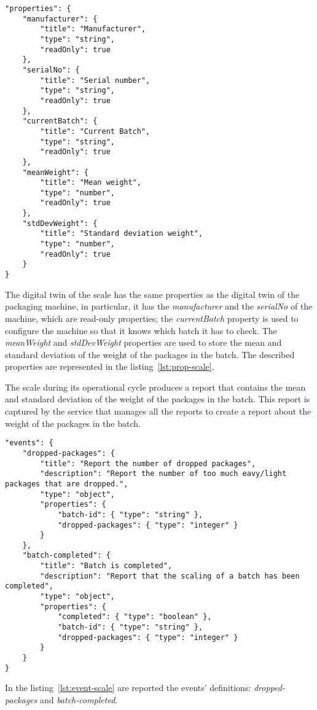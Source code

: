 \begin{lstlisting}[caption={Properties of the scale Thing Model.},label={lst:prop-scale}]
"properties": {
	"manufacturer": {
		"title": "Manufacturer",
		"type": "string",
		"readOnly": true
	},
	"serialNo": {
		"title": "Serial number",
		"type": "string",
		"readOnly": true
	},
	"currentBatch": {
		"title": "Current Batch",
		"type": "string",
		"readOnly": true
	},
	"meanWeight": {
		"title": "Mean weight",
		"type": "number",
		"readOnly": true
	},
	"stdDevWeight": {
		"title": "Standard deviation weight",
		"type": "number",
		"readOnly": true
	}
}
\end{lstlisting}

The digital twin of the scale has the same properties as the digital twin of the packaging machine, in particular, it has the \textit{manufacturer} and the \textit{serialNo} of the machine, which are read-only properties; the \textit{currentBatch} property is used to configure the machine so that it knows which batch it has to check. The \textit{meanWeight} and \textit{stdDevWeight} properties are used to store the mean and standard deviation of the weight of the packages in the batch. The described properties are represented in the listing~\ref{lst:prop-scale}.

The scale during its operational cycle produces a report that contains the mean and standard deviation of the weight of the packages in the batch. This report is captured by the service that manages all the reports to create a report about the weight of the packages in the batch.

\newpage

\begin{lstlisting}[caption={Events of the scale Thing Model.},label={lst:event-scale}]
"events": {
	"dropped-packages": {
		"title": "Report the number of dropped packages",
		"description": "Report the number of too much eavy/light packages that are dropped.",
		"type": "object",
		"properties": {
			"batch-id": { "type": "string" },
			"dropped-packages": { "type": "integer" }
		}
	},
	"batch-completed": {
		"title": "Batch is completed",
		"description": "Report that the scaling of a batch has been completed",
		"type": "object",
		"properties": {
			"completed": { "type": "boolean" },
			"batch-id": { "type": "string" },
			"dropped-packages": { "type": "integer" }
		}
	}
}
\end{lstlisting}

In the listing~\ref{lst:event-scale} are reported the events' definitions: \textit{dropped-packages} and \textit{batch-completed}.

